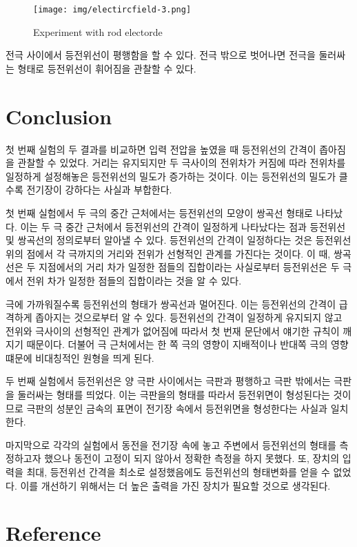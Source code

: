 \documentclass[a4paper]{article}
\begin{document}
		\begin{figure}[h]
			\begin{center}
				\texttt{[image: img/electircfield-3.png]}
				\caption{Experiment with rod electorde} \label{fig:fig4}
			\end{center}
		\end{figure}

		전극 사이에서 등전위선이 평행함을 할 수 있다. 전극 밖으로 벗어나면 전극을 둘러싸는 형태로 등전위선이 휘어짐을 관찰할 수 있다.
\newpage

\section{Conclusion}
	
	첫 번째 실험의 두 결과를 비교하면 입력 전압을 높였을 때 등전위선의 간격이 좁아짐을 관찰할 수 있었다. 거리는 유지되지만 두 극사이의 전위차가 커짐에 따라 전위차를 일정하게 설정해놓은 등전위선의 밀도가 증가하는 것이다. 이는 등전위선의 밀도가 클수록 전기장이 강하다는 사실과 부합한다.

	첫 번째 실험에서 두 극의 중간 근처에서는 등전위선의 모양이 쌍곡선 형태로 나타났다. 이는 두 극 중간 근처에서 등전위선의 간격이 일정하게 나타났다는 점과 등전위선 및 쌍곡선의 정의로부터 알아낼 수 있다. 등전위선의 간격이 일정하다는 것은 등전위선위의 점에서 각 극까지의 거리와 전위가 선형적인 관계를 가진다는 것이다. 이 때, 쌍곡선은 두 지점에서의 거리 차가 일정한 점들의 집합이라는 사실로부터 등전위선은 두 극에서 전위 차가 일정한 점들의 집합이라는 것을 알 수 있다.

	극에 가까워질수록 등전위선의 형태가 쌍곡선과 멀어진다. 이는 등전위선의 간격이 급격하게 좁아지는 것으로부터 알 수 있다. 등전위선의 간격이 일정하게 유지되지 않고 전위와 극사이의 선형적인 관계가 없어짐에 따라서 첫 번재 문단에서 얘기한 규칙이 깨지기 때문이다. 더불어 극 근처에서는 한 쪽 극의 영향이 지배적이나 반대쪽 극의 영향 떄문에 비대칭적인 원형을 띄게 된다.

	두 번째 실험에서 등전위선은 양 극판 사이에서는 극판과 평행하고 극판 밖에서는 극판을 둘러싸는 형태를 띄었다. 이는 극판을의 형태를 따라서 등전위면이 형성된다는 것이므로 극판의 성분인 금속의 표면이 전기장 속에서 등전위면을 형성한다는 사실과 일치한다.

	마지막으로 각각의 실험에서 동전을 전기장 속에 놓고 주변에서 등전위선의 형태를 측정하고자 했으나 동전이 고정이 되지 않아서 정확한 측정을 하지 못했다. 또, 장치의 입력을 최대, 등전위선 간격을 최소로 설정했음에도 등전위선의 형태변화를 얻을 수 없었다. 이를 개선하기 위해서는 더 높은 출력을 가진 장치가 필요할 것으로 생각된다. 

\section{Reference}
\end{document}
